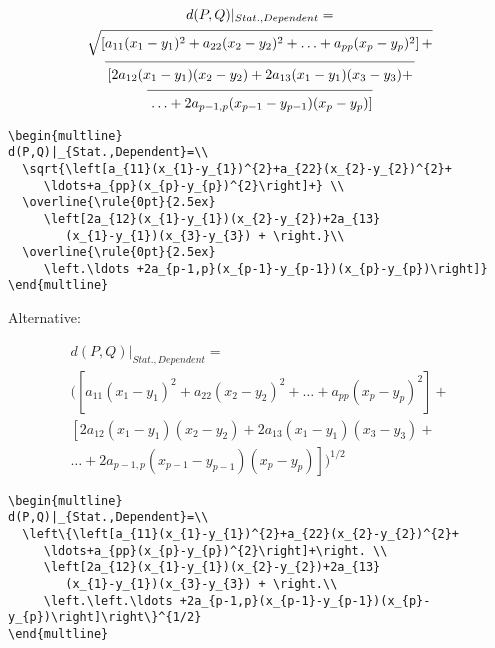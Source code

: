 \begin{table}[htb]
\begin{multline}
d(P,Q)|_{Stat.,Dependent}=\\
  \sqrt{\left[a_{11}(x_{1}-y_{1})^{2}+a_{22}(x_{2}-y_{2})^{2}+
     \ldots+a_{pp}(x_{p}-y_{p})^{2}\right]+} \\
  \overline{\rule{0pt}{2.5ex}
     \left[2a_{12}(x_{1}-y_{1})(x_{2}-y_{2})+2a_{13}
        (x_{1}-y_{1})(x_{3}-y_{3}) + \right.}\\  
  \overline{\rule{0pt}{2.5ex}
     \left.\ldots +2a_{p-1,p}(x_{p-1}-y_{p-1})(x_{p}-y_{p})\right]}
\end{multline}


\begin{lstlisting}
\begin{multline}
d(P,Q)|_{Stat.,Dependent}=\\
  \sqrt{\left[a_{11}(x_{1}-y_{1})^{2}+a_{22}(x_{2}-y_{2})^{2}+
     \ldots+a_{pp}(x_{p}-y_{p})^{2}\right]+} \\
  \overline{\rule{0pt}{2.5ex}
     \left[2a_{12}(x_{1}-y_{1})(x_{2}-y_{2})+2a_{13}
        (x_{1}-y_{1})(x_{3}-y_{3}) + \right.}\\  
  \overline{\rule{0pt}{2.5ex}
     \left.\ldots +2a_{p-1,p}(x_{p-1}-y_{p-1})(x_{p}-y_{p})\right]}
\end{multline}
\end{lstlisting}


Alternative:

\begin{multline}
d(P,Q)|_{Stat.,Dependent}=\\
  \Big(\left[a_{11}(x_{1}-y_{1})^{2}+a_{22}(x_{2}-y_{2})^{2}+
     \ldots+a_{pp}(x_{p}-y_{p})^{2}\right]+ \\
     \left[2a_{12}(x_{1}-y_{1})(x_{2}-y_{2})+2a_{13}
        (x_{1}-y_{1})(x_{3}-y_{3}) + \right.\\  
     \left.\ldots +2a_{p-1,p}(x_{p-1}-y_{p-1})(x_{p}-y_{p})\right]\Big)^{1/2}
\end{multline}


\begin{lstlisting}
\begin{multline}
d(P,Q)|_{Stat.,Dependent}=\\
  \left\{\left[a_{11}(x_{1}-y_{1})^{2}+a_{22}(x_{2}-y_{2})^{2}+
     \ldots+a_{pp}(x_{p}-y_{p})^{2}\right]+\right. \\
     \left[2a_{12}(x_{1}-y_{1})(x_{2}-y_{2})+2a_{13}
        (x_{1}-y_{1})(x_{3}-y_{3}) + \right.\\  
     \left.\left.\ldots +2a_{p-1,p}(x_{p-1}-y_{p-1})(x_{p}-y_{p})\right]\right\}^{1/2}
\end{multline}
\end{lstlisting}




\end{table}
